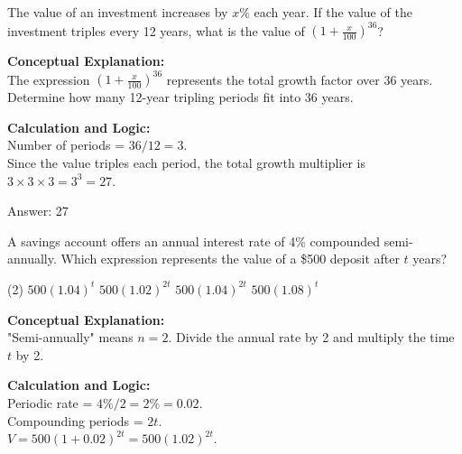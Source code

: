 \documentclass[11pt,paper=a4,answers]{exam}
\begin{document}
\begin{questions}
\vspace{40pt}

\question
The value of an investment increases by $x\%$ each year. If the value of the investment triples every 12 years, what is the value of $(1 + \frac{x}{100})^{36}$?

\begin{solution}
\textbf{Conceptual Explanation:} \\
The expression $(1 + \frac{x}{100})^{36}$ represents the total growth factor over 36 years. Determine how many 12-year tripling periods fit into 36 years.

\vspace{20pt}

\textbf{Calculation and Logic:} \\
Number of periods = $36 / 12 = 3$. \\
Since the value triples each period, the total growth multiplier is $3 \times 3 \times 3 = 3^3 = 27$.

\vspace{25pt}

Answer: \colorbox{yellow!100}{27}
\end{solution}

\vspace{40pt}

\question
A savings account offers an annual interest rate of 4\% compounded semi-annually. Which expression represents the value of a \$500 deposit after $t$ years?
\begin{tasks}(2)
    \task $500(1.04)^t$
    \task $500(1.02)^{2t}$
    \task $500(1.04)^{2t}$
    \task $500(1.08)^t$
\end{tasks}

\begin{solution}
\textbf{Conceptual Explanation:} \\
"Semi-annually" means $n = 2$. Divide the annual rate by 2 and multiply the time $t$ by 2.

\vspace{20pt}

\textbf{Calculation and Logic:} \\
Periodic rate = $4\% / 2 = 2\% = 0.02$. \\
Compounding periods = $2t$. \\
$V = 500(1 + 0.02)^{2t} = 500(1.02)^{2t}$.


\end{solution}
\end{questions}
\end{document}
